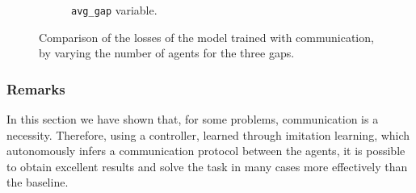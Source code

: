 \begin{figure}[!htb]
\begin{center}
\begin{subfigure}[h]{0.32\textwidth}
			\caption{\texttt{avg\_gap} variable.}
		\end{subfigure}
	\end{center}
	\vspace{-0.5cm}
	\caption[Losses summary of the second task 
	(communication).]{Comparison of the losses of the model trained with 
	communication, by varying the number of agents for the three gaps.}
	\label{fig:commlosst2}
	\vspace{-0.5cm}
\end{figure}

\subsubsection{Remarks}
\label{subsubsec:remarks-task2-comm}

In this section we have shown that, for some problems, communication is a 
necessity. 
Therefore, using a controller, learned through imitation learning, which 
autonomously infers a communication protocol between the agents, it is possible 
to obtain excellent results and solve the task in many cases more effectively than 
the baseline.
